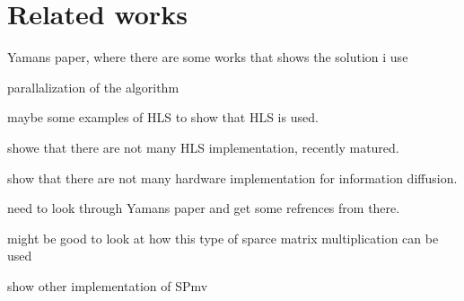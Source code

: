 \chapter{Related works} \label{relatedWork}

\begin{list_type}  
\item Yamans paper, where there are some works that shows the solution i use
\item parallalization of the algorithm
\item maybe some examples of HLS to show that HLS is used.
\item showe that there are not many HLS implementation, recently matured. 
\item show that there are not many hardware implementation for information diffusion.
\item need to look through Yamans paper and get some refrences from there.
\item might be good to look at how this type of sparce matrix multiplication can be used
\item show other implementation of SPmv
\item 
\end{list_type}


